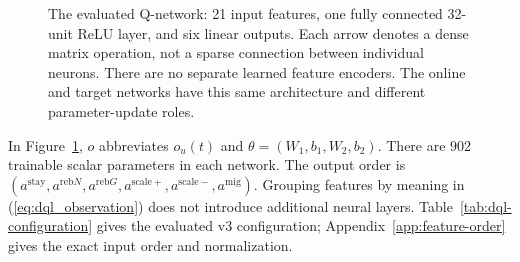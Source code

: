 \documentclass[manuscript]{acmart}
\begin{document}
\begin{figure}[!htbp]
\centering
{}
\caption{The evaluated Q-network: 21 input features, one fully connected
32-unit ReLU layer, and six linear outputs. Each arrow denotes a dense matrix
operation, not a sparse connection between individual neurons. There are no
separate learned feature encoders. The online and target networks have this
same architecture and different parameter-update roles.}
\label{fig:dql_q_network_tree}
\end{figure}

In Figure~\ref{fig:dql_q_network_tree}, $o$ abbreviates $o_u(t)$ and
$\theta=(W_1,b_1,W_2,b_2)$. There are $902$ trainable scalar parameters in
each network. The output order is
$(a^{\mathrm{stay}},a^{\mathrm{reb}N},a^{\mathrm{reb}G},
a^{\mathrm{scale}+},a^{\mathrm{scale}-},a^{\mathrm{mig}})$.
Grouping features by meaning in (\ref{eq:dql_observation}) does not introduce
additional neural layers. Table~\ref{tab:dql-configuration} gives the
evaluated v3 configuration; Appendix~\ref{app:feature-order} gives the exact
input order and normalization.
\end{document}
